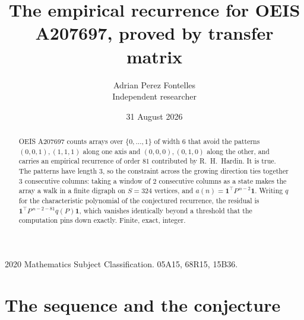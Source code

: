 \documentclass[11pt,a4paper]{article}
\title{The empirical recurrence for OEIS A207697, proved by transfer matrix}
\author{Adrian Perez Fontelles\\ \small Independent researcher}
\date{31 August 2026}
\theoremstyle{plain}
\theoremstyle{definition}
\begin{document}
\maketitle

\begin{abstract}
OEIS A207697 counts arrays over $\{0,\dots,1\}$ of width $6$ that avoid the patterns
$(0,0,1), (1,1,1)$ along one axis and $(0,0,0), (0,1,0)$ along the other, and carries an empirical recurrence of
order $81$ contributed by R.~H.~Hardin. It is true. The patterns have length $3$, so
the constraint across the growing direction ties together $3$ consecutive columns: taking a
window of $2$ consecutive columns as a state makes the array a walk in a finite digraph
on $S=324$ vertices, and $a(n)=\mathbf{1}^{\!\top}P^{\,n-2}\mathbf{1}$. Writing $q$
for the characteristic polynomial of the conjectured recurrence, the residual is
$\mathbf{1}^{\!\top}P^{\,n-2-81}q(P)\mathbf{1}$, which vanishes identically
beyond a threshold that the computation pins down exactly. Finite, exact, integer.
\end{abstract}

\noindent\small 2020 Mathematics Subject Classification. 05A15, 68R15, 15B36.\normalsize

\section{The sequence and the conjecture}
\end{document}

